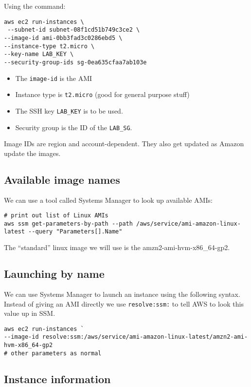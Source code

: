 \documentclass{pgnotes}
\begin{document}
Using the command: 

\begin{verbatim}
aws ec2 run-instances \
 --subnet-id subnet-08f1cd51b749c3ce2 \
--image-id ami-0bb3fad3c0286ebd5 \
--instance-type t2.micro \
--key-name LAB_KEY \
--security-group-ids sg-0ea635cfaa7ab103e
\end{verbatim}

\begin{itemize}
\item The \texttt{image-id} is the AMI 
\item Instance type is \texttt{t2.micro} (good for general purpose stuff)
\item The SSH key \texttt{LAB\_KEY} is to be used.
\item Security group is the ID of the \texttt{LAB\_SG}. 
\end{itemize}

Image IDs are region and account-dependent.
They also get updated as Amazon update the images.

\subsection{Available image names}

We can use a tool called Systems Manager to look up available AMIs:

\begin{verbatim}
# print out list of Linux AMIs
aws ssm get-parameters-by-path --path /aws/service/ami-amazon-linux-latest --query "Parameters[].Name"
\end{verbatim}
The ``standard'' linux image we will use is the amzn2-ami-hvm-x86\_64-gp2.

\subsection{Launching by name}

We can use Systems Manager to launch an instance using the following syntax.
Instead of giving an AMI directly we use \texttt{resolve:ssm:} to tell AWS to look this value up in SSM. 
\begin{verbatim}
aws ec2 run-instances `
--image-id resolve:ssm:/aws/service/ami-amazon-linux-latest/amzn2-ami-hvm-x86_64-gp2
# other parameters as normal 
\end{verbatim}

\subsection{Instance information}
\end{document}
